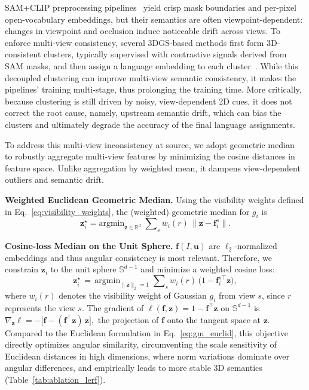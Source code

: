 SAM+CLIP preprocessing pipelines~\cite{qin2024langsplat} yield crisp mask boundaries and per-pixel open-vocabulary embeddings, but their semantics are often viewpoint-dependent: changes in viewpoint and occlusion induce noticeable drift across views. To enforce multi-view consistency, several 3DGS-based methods first form 3D-consistent clusters, typically supervised with contrastive signals derived from SAM masks, and then assign a language embedding to each cluster~\cite{wu2024opengaussian, liang2024supergseg, li2024instancegaussian, piekenbrinck2025opensplat3d}. While this decoupled clustering can improve multi-view semantic consistency, it makes the pipelines' training multi-stage, thus prolonging the training time. More critically, because clustering is still driven by noisy, view-dependent 2D cues, it does not correct the root cause, namely, upstream semantic drift, which can bias the clusters and ultimately degrade the accuracy of the final language assignments.

To address this multi-view inconsistency at source, we adopt geometric median~\cite{martini1995torricelli, weiszfeld2008english, beck2015weiszfeld} to robustly aggregate multi-view features by minimizing the cosine distances in feature space. Unlike aggregation by weighted mean, it dampens view-dependent outliers and semantic drift.

\textbf{Weighted Euclidean Geometric Median.}
Using the visibility weights defined in Eq.~\eqref{eq:visibility_weights}, the (weighted) geometric median for $g_i$ is
\begin{equation}
\label{eq:gm_euclid}
\mathbf{z}_i^\star
=
\text{argmin}_{\mathbf{z}\in\mathbb{R}^d}
\;\sum\nolimits_{s} 
w_i(r)\,\bigl\lVert \mathbf{z} - \mathbf{f}_i^s \bigr\rVert .
\end{equation}

\textbf{Cosine-loss Median on the Unit Sphere.}
$\mathbf{f}(I,\mathbf{u})$ are $\ell_2$-normalized embeddings and thus angular consistency is most relevant. Therefore, we constrain $\mathbf{z}_i$ to the unit sphere $\mathbb{S}^{d-1}$ and minimize a weighted cosine loss:
\vspace{-3mm}
\begin{equation}
\label{eq:cosine_obj}
\mathbf{z}_i^\star 
\,=\, \text{argmin}_{\lVert \mathbf{z}\rVert_2=1}
\;\sum\nolimits_{s}
w_i(r)\,\bigl( 1 - \mathbf{f}_i^{s\top} \mathbf{z} \bigr),
\end{equation}
where $w_i(r)$ denotes the visibility weight of Gaussian $g_i$ from view $s$, since $r$ represents the view $s$.
The gradient of $\ell(\mathbf{f},\mathbf{z})=1-\mathbf{f}^\top\mathbf{z}$ on $\mathbb{S}^{d-1}$ is
\(
\nabla_{\mathbf{z}} \ell = -\bigl[\mathbf{f}-(\mathbf{f}^\top\mathbf{z})\,\mathbf{z}\bigr],
\)
the projection of $\mathbf{f}$ onto the tangent space at $\mathbf{z}$.
Compared to the Euclidean formulation in Eq.~\eqref{eq:gm_euclid}, this objective directly optimizes angular similarity, circumventing the scale sensitivity of Euclidean distances in high dimensions, where norm variations dominate over angular differences, and empirically leads to more stable 3D semantics (Table~\ref{tab:ablation_lerf}). 

